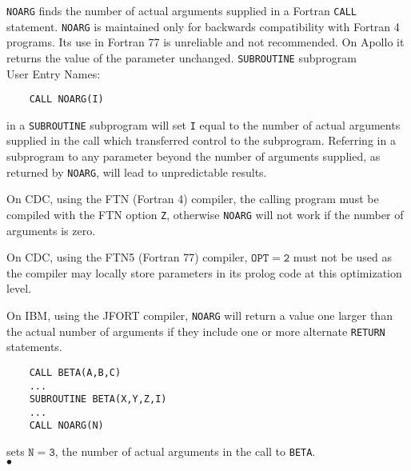                             
                             
                      
                           
\begin{center}
\end{center}
{\tt NOARG} finds the number of actual arguments supplied in a
Fortran {\tt CALL} statement. {\tt NOARG} is maintained only for
backwards compatibility with Fortran 4 programs. Its use in
Fortran 77 is unreliable and not recommended. On Apollo it returns
the value of the parameter unchanged.
\Structure
{\tt SUBROUTINE} subprogram \\
User Entry Names: 
\Usage
\begin{verbatim}
    CALL NOARG(I)
\end{verbatim}
in a {\tt SUBROUTINE} subprogram will set {\tt I} equal to the number of
actual arguments supplied in the call which transferred control to the
subprogram.
\Notes
Referring in a subprogram to any parameter beyond the number of
arguments supplied, as returned by {\tt NOARG}, will lead to
unpredictable results.
\par
On CDC, using the FTN (Fortran 4) compiler, the calling program
must be compiled with the FTN option {\tt Z}, otherwise {\tt NOARG}
will not work if the number of arguments is zero.
\par
On CDC, using the FTN5 (Fortran 77) compiler, $\mathtt{OPT=2}$ must
not be used as the compiler may locally store parameters in its prolog
code at this optimization level.
\par
On IBM, using the JFORT compiler, {\tt NOARG} will return a value
one larger than the actual number of arguments if they include one
or more alternate {\tt RETURN} statements.
\Examples
\begin{verbatim}
    CALL BETA(A,B,C)
    ...
    SUBROUTINE BETA(X,Y,Z,I)
    ...
    CALL NOARG(N)
\end{verbatim}
sets $\mathtt{N=3}$, the number of actual arguments in the call to
{\tt BETA}.
\\ $\bullet$
